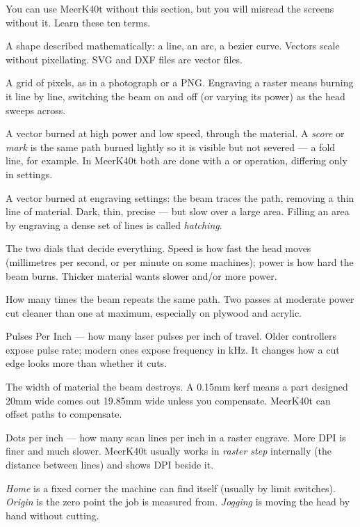 You can use MeerK40t without this section, but you will misread the screens
without it. Learn these ten terms.

\begin{description}[leftmargin=1.4em,style=nextline]
  \item[Vector] A shape described mathematically: a line, an arc, a bezier
        curve. Vectors scale without pixellating. SVG and DXF files are vector
        files.
  \item[Raster] A grid of pixels, as in a photograph or a PNG. Engraving a
        raster means burning it line by line, switching the beam on and off (or
        varying its power) as the head sweeps across.
  \item[Cut / Score] A vector burned at high power and low speed, through the
        material. A \emph{score} or \emph{mark} is the same path burned lightly
        so it is visible but not severed --- a fold line, for example. In
        MeerK40t both are done with a  or 
        operation, differing only in settings.
  \item[Engrave] A vector burned at engraving settings: the beam traces the
        path, removing a thin line of material. Dark, thin, precise --- but slow
        over a large area. Filling an area by engraving a dense set of lines is
        called \emph{hatching}.
  \item[Speed and power] The two dials that decide everything. Speed is how fast
        the head moves (millimetres per second, or per minute on some machines);
        power is how hard the beam burns. Thicker material wants slower and/or
        more power.
  \item[Passes] How many times the beam repeats the same path. Two passes at
        moderate power cut cleaner than one at maximum, especially on plywood
        and acrylic.
  \item[PPI / frequency] Pulses Per Inch --- how many laser pulses per inch of
        travel. Older controllers expose pulse rate; modern ones expose
        frequency in kHz. It changes how a cut edge looks more than whether it
        cuts.
  \item[Kerf] The width of material the beam destroys. A 0.15\unit{mm} kerf
        means a part designed 20\unit{mm} wide comes out 19.85\unit{mm} wide
        unless you compensate. MeerK40t can offset paths to compensate.
  \item[DPI / raster step] Dots per inch --- how many scan lines per inch in a
        raster engrave. More DPI is finer and much slower. MeerK40t usually
        works in \emph{raster step} internally (the distance between lines) and
        shows DPI beside it.
  \item[Origin / home / jog] \emph{Home} is a fixed corner the machine can find
        itself (usually by limit switches). \emph{Origin} is the zero point the
        job is measured from. \emph{Jogging} is moving the head by hand without
        cutting.
\end{description}

